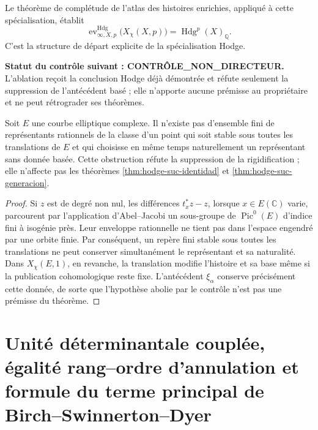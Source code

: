 Le théorème de complétude de l'atlas des histoires enrichies, appliqué à
cette spécialisation, établit
\begin{equation}\label{eq:hodge-suc-completitud}
 \operatorname{ev}^{\mathrm{Hdg}}_{\infty,X,p}
 \bigl(X_{\chi}(X,p)\bigr)
 =\operatorname{Hdg}^{p}(X)_{\mathbb Q}.
\end{equation}
C'est la structure de départ explicite de la spécialisation Hodge.



\noindent\textbf{Statut du contrôle suivant : CONTRÔLE\_NON\_DIRECTEUR.}
L'ablation reçoit la conclusion Hodge déjà démontrée et réfute seulement la
suppression de l'antécédent basé ; elle n'apporte aucune prémisse au propriétaire et ne
peut rétrograder ses théorèmes.

\begin{ablation}
\label{abl:hodge-suc-eliptico}
Soit \(E\) une courbe elliptique complexe. Il n'existe pas d'ensemble fini de
représentants rationnels de la classe d'un point qui soit stable sous toutes
les translations de \(E\) et qui choisisse en même temps naturellement un
représentant sans donnée basée. Cette obstruction réfute la suppression de la
rigidification ; elle n'affecte pas les théorèmes
\ref{thm:hodge-suc-identidad} et \ref{thm:hodge-suc-generacion}.
\end{ablation}

\begin{proof}
Si \(z\) est de degré non nul, les différences
\(t_x^{*}z-z\), lorsque \(x\in E(\mathbb C)\) varie, parcourent par
l'application d'Abel--Jacobi un sous-groupe de \(\operatorname{Pic}^{0}(E)\)
d'indice fini à isogénie près. Leur enveloppe rationnelle ne tient pas dans l'espace
engendré par une orbite finie. Par conséquent, un repère fini stable sous toutes
les translations ne peut conserver simultanément le représentant et sa
naturalité. Dans \(X_{\chi}(E,1)\), en revanche, la translation modifie
l'histoire et sa base même si la publication cohomologique reste fixe.
L'antécédent \(\xi_{\alpha}\) conserve précisément cette donnée, de sorte que
l'hypothèse abolie par le contrôle n'est pas une prémisse du théorème.
\end{proof}
\chapter{Unité déterminantale couplée, égalité rang--ordre d'annulation et formule du terme principal de Birch--Swinnerton--Dyer}

